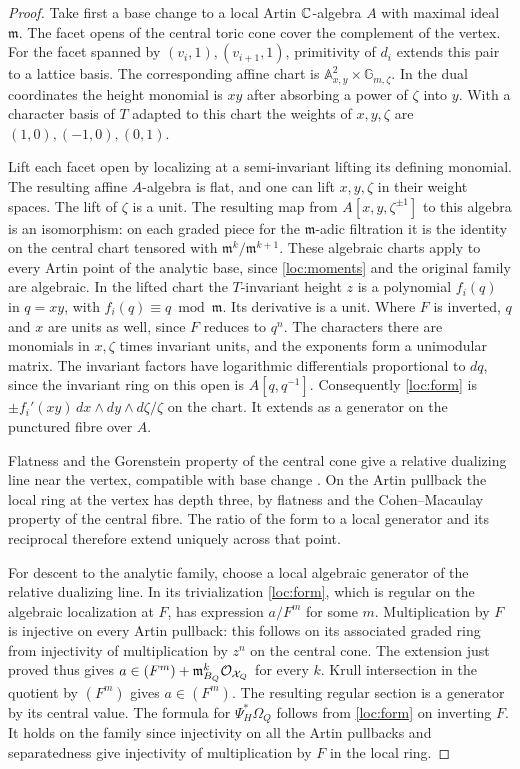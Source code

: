 \begin{proof}
Take first a base change to a local Artin $\mathbb C$-algebra $A$ with maximal
ideal $\mathfrak m$. The facet opens of the central toric cone cover
the complement of the vertex. For the facet spanned by
$(v_i,1),(v_{i+1},1)$, primitivity of $d_i$ extends this pair to a
lattice basis. The corresponding affine chart is
$\mathbb A^2_{x,y}\times\mathbb G_{m,\zeta}$. In the dual coordinates
the height monomial is $xy$ after absorbing a power of $\zeta$ into
$y$. With a character basis of $T$ adapted to this chart the weights
of $x,y,\zeta$ are $(1,0),(-1,0),(0,1)$.

Lift each facet open by localizing at a semi-invariant lifting its
defining monomial. The resulting affine $A$-algebra is flat, and one
can lift $x,y,\zeta$ in their weight spaces. The lift of $\zeta$ is a
unit. The resulting map from $A[x,y,\zeta^{\pm1}]$ to this algebra
is an isomorphism: on each graded piece for the $\mathfrak m$-adic
filtration it is the identity on the central chart tensored with
$\mathfrak m^k/\mathfrak m^{k+1}$. These algebraic charts apply to
every Artin point of the analytic base, since \eqref{loc:moments} and
the original family are algebraic. In the lifted chart the $T$-invariant
height $z$ is a polynomial $f_i(q)$ in $q=xy$, with
$f_i(q)\equiv q\bmod\mathfrak m$. Its derivative is a unit.
Where $F$ is inverted, $q$ and $x$ are units as well, since $F$
reduces to $q^n$. The characters there are monomials in $x,\zeta$
times invariant units, and the exponents form a unimodular matrix.
The invariant factors have logarithmic differentials proportional to
$dq$, since the invariant ring on this open is $A[q,q^{-1}]$.
Consequently \eqref{loc:form} is
$\pm f_i'(xy)\,dx\wedge dy\wedge d\zeta/\zeta$ on the chart. It
extends as a generator on the punctured fibre over $A$.

Flatness and the Gorenstein property of the central cone give a
relative dualizing line near the vertex, compatible with base change
\cite[Tags 0E4C and 0C08]{Stacks}. On the Artin pullback the local
ring at the vertex has depth three, by flatness and the
Cohen--Macaulay property of the central fibre. The ratio of the form
to a local generator and its reciprocal therefore extend uniquely
across that point.

For descent to the analytic family, choose a local algebraic
generator of the relative dualizing line. In its trivialization
\eqref{loc:form}, which is regular on the algebraic localization at
$F$, has expression $a/F^m$ for some $m$. Multiplication by $F$ is
injective on every Artin pullback: this follows on its associated
graded ring from injectivity of multiplication by $z^n$ on the central
cone. The extension just proved thus gives
$a\in(F^m)+\mathfrak m_{B_Q}^k\mathcal O_{\mathcal X_Q}$ for every $k$.
Krull intersection in the quotient by $(F^m)$ gives $a\in(F^m)$.
The resulting regular section is a generator by its central value.
The formula for $\Psi_H^*\Omega_Q$ follows from
\eqref{loc:form} on inverting $F$. It holds on the family since
injectivity on all the Artin pullbacks and separatedness give
injectivity of multiplication by $F$ in the local ring.
\end{proof}


